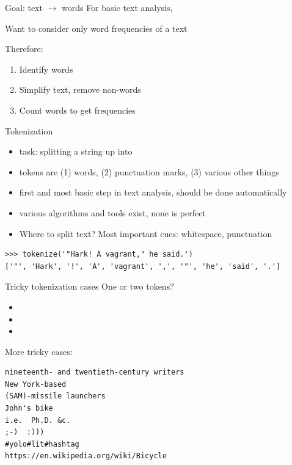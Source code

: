 \documentclass[aspectratio=169,usenames,dvipsnames]{beamer}
\begin{document}
\begin{frame}{Goal: text $\rightarrow$ words}
    For basic text analysis,

    Want to consider only word frequencies of a text

    \pause
    Therefore:
    \begin{enumerate}
        \item Identify words
        \item Simplify text, remove non-words
        \item Count words to get frequencies
    \end{enumerate}
\end{frame}


\begin{frame}[fragile]{Tokenization}
 \begin{itemize}
  \item task: splitting a string up into 
  \item tokens are (1) words, (2) punctuation marks, (3) various other things
  \item first and most basic step in text analysis,
        should be done automatically
  \item various algorithms and tools exist, none is perfect
  \item Where to split text? Most important cues: whitespace, punctuation
 \end{itemize}
 \begin{lstlisting}
>>> tokenize('"Hark! A vagrant," he said.')
['"', 'Hark', '!', 'A', 'vagrant', ',', '"', 'he', 'said', '.']
 \end{lstlisting}
\end{frame}

\begin{frame}[fragile]{Tricky tokenization cases}
One or two tokens?
 \begin{itemize}
  \item {}
  \item {}
  \item {}
 \end{itemize}

\pause
\vspace{1em}
More tricky cases:
\begin{verbatim}
nineteenth- and twentieth-century writers
New York-based
(SAM)-missile launchers
John's bike
i.e.  Ph.D. &c.
;-)  :)))
#yolo#lit#hashtag
https://en.wikipedia.org/wiki/Bicycle
\end{verbatim}
\end{frame}
\end{document}

